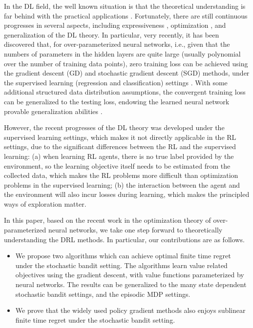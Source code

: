 In the DL field, the well known situation is that the theoretical understanding is far behind with the practical applications \citep{goodfellow2016deep,zhang2016understanding}. Fortunately, there are still continuous progresses in several aspects, including expressiveness \citep{cybenko1989approximation,raghu2017expressive}, optimization \citep{kawaguchi2016deep,li2017convergence,li2018learning,du2018gradientA,du2018gradientB,allen2018convergenceA,allen2018convergenceB}, and generalization \cite{neyshabur2017exploring,allen2018learning} of the DL theory. In particular, very recently, it has been discovered that, for over-parameterized neural networks, i.e., given that the numbers of parameters in the hidden layers are quite large (usually polynomial over the number of training data points), zero training loss can be achieved using the gradient descent (GD) and stochastic gradient descent (SGD) methods, under the supervised learning (regression and classification) settings \citep{li2018learning,du2018gradientA,du2018gradientB,allen2018convergenceA,allen2018convergenceB}. With some additional structured data distribution assumptions, the convergent training loss can be generalized to the testing loss, endowing the learned neural network provable generalization abilities \citep{li2018learning,allen2018learning}.

However, the recent progresses of the DL theory was developed under the supervised learning settings, which makes it not directly applicable in the RL settings, due to the significant differences between the RL and the supervised learning: (a) when learning RL agents, there is no true label provided by the environment, so the learning objective itself needs to be estimated from the collected data, which makes the RL problems more difficult than optimization problems in the supervised learning; (b) the interaction between the  agent and the environment will also incur losses during learning, which makes the principled ways of exploration matter.

In this paper, based on the recent work in the optimization theory of over-parameterized neural networks, we take one step forward to theoretically understanding the DRL methods. In particular, our contributions are as follows.

\begin{itemize}
    \item We propose two algorithms which can achieve optimal finite time regret under the stochastic bandit setting. The algorithms learn value related objectives using the gradient descent, with value functions parameterized by neural networks. The results can be generalized to the many state dependent stochastic bandit settings, and the episodic MDP settings.
    \item We prove that the widely used policy gradient methods also enjoys sublinear finite time regret under the stochastic bandit setting.
\end{itemize}

